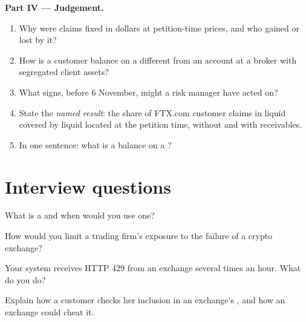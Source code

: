 \begin{problem}
\medskip\noindent\textbf{Part IV --- Judgement.}
\begin{enumerate}[resume]
\item Why were claims fixed in dollars at petition-time prices, and who gained or lost by it?
\item How is a customer balance on a  different from an account at a broker with
segregated client assets?
\item What signs, before 6 November, might a risk manager have acted on?
\item State the \emph{named result}: the share of FTX.com customer claims in liquid  covered by liquid
 located at the petition time, without and with receivables.
\item In one sentence: what is a balance on a ?
\end{enumerate}
\end{problem}

\section{Interview questions}

\begin{interviewq}\label{iq:m3:centralised-exchanges:1}
What is a  and when would you use one?
\end{interviewq}

\begin{interviewq}\label{iq:m3:centralised-exchanges:2}
How would you limit a trading firm's exposure to the failure of a crypto exchange?
\end{interviewq}

\begin{interviewq}\label{iq:m3:centralised-exchanges:3}
Your system receives HTTP 429 from an exchange several times an hour. What do you do?
\end{interviewq}

\begin{interviewq}\label{iq:m3:centralised-exchanges:4}
Explain how a customer checks her inclusion in an exchange's , and how an exchange could
cheat it.
\end{interviewq}

